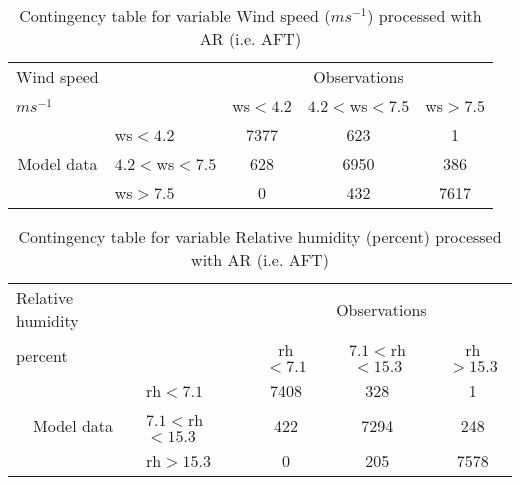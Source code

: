 \documentclass[11pt,english]{article}
\begin{document}
\begin{table}[]
\begin{center}
\begin{tabular}{llccc}
\hline
{Wind speed}                                       &                                                    & \multicolumn{3}{c}{Observations}                 \\
{$m s^{-1}$}                                       &                             & ws$<4.2$   & $4.2<$ws$<7.5$ & ws$>7.5$ \\
\hline
\multicolumn{1}{c}{\multirow{3}{*}{Model data}}  & ws$<4.2$          & 7377                & 623                       & 1              \\
                                                 & $4.2<$ws$<7.5$ & 628                & 6950                       & 386              \\
                                                 & ws$>7.5$          & 0                & 432                       & 7617              \\
\hline
\end{tabular}
\end{center}
\caption{Contingency table for variable Wind speed ($m s^{-1}$) processed with AR (i.e. AFT)}
\label{tab:contingency}
\end{table}

\begin{table}[]
\begin{center}
\begin{tabular}{llccc}
\hline
{Relative humidity}                                       &                                                    & \multicolumn{3}{c}{Observations}                 \\
{percent}                                       &                             & rh$<7.1$   & $7.1<$rh$<15.3$ & rh$>15.3$ \\
\hline
\multicolumn{1}{c}{\multirow{3}{*}{Model data}}  & rh$<7.1$          & 7408                & 328                       & 1              \\
                                                 & $7.1<$rh$<15.3$ & 422                & 7294                       & 248              \\
                                                 & rh$>15.3$          & 0                & 205                       & 7578              \\
\hline
\end{tabular}
\end{center}
\caption{Contingency table for variable Relative humidity (percent) processed with AR (i.e. AFT)}
\label{tab:contingency}
\end{table}
\end{document}
